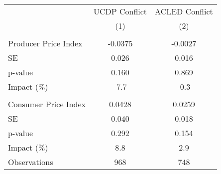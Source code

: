 {
\def\sym#1{\ifmmode^{#1}\else\(^{#1}\)\fi}
\begin{tabular}{l*{2}{c}}
\hline\hline
                    &\multicolumn{1}{c}{UCDP Conflict}&\multicolumn{1}{c}{ACLED Conflict}\\\cmidrule(lr){2-2}\cmidrule(lr){3-3}
                    &\multicolumn{1}{c}{(1)}         &\multicolumn{1}{c}{(2)}         \\
\hline
\hline
\\ Producer Price Index&     -0.0375         &     -0.0027         \\
\hspace{15pt}  SE   &       0.026         &       0.016         \\
\hspace{15pt} p-value&       0.160         &       0.869         \\
\hspace{15pt} Impact (\%)&        -7.7         &        -0.3         \\
\\ Consumer Price Index&      0.0428         &      0.0259         \\
\hspace{15pt}  SE   &       0.040         &       0.018         \\
\hspace{15pt} p-value&       0.292         &       0.154         \\
\hspace{15pt} Impact (\%)&         8.8         &         2.9         \\
Observations        &         968         &         748         \\
\hline\hline
\end{tabular}
}
